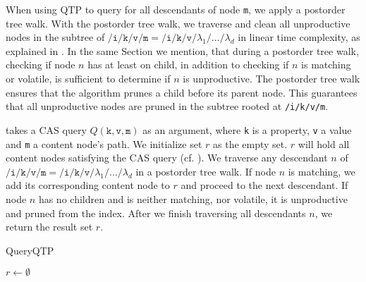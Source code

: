 \documentclass[abstracton,12pt]{scrartcl}
\theoremstyle{definition}
\begin{document}
When using QTP to query for all descendants of node \texttt{m}, we apply a postorder tree walk.
With the postorder tree walk, we traverse and clean all unproductive nodes in
the subtree of $\texttt{/i/k/v/m} =
\texttt{/i/k/v/} \lambda_1 \texttt{/} \dots \texttt{/} \lambda_d$ in linear time
complexity, as explained in . In the same Section we mention, that
during a postorder tree walk,
checking if node $n$ has at least on child, in addition to checking if $n$ is
matching or volatile, is sufficient to determine if $n$ is unproductive.
The postorder tree walk ensures that the algorithm prunes
a child before its parent node. This guarantees that all unproductive nodes are
pruned in the subtree rooted at \texttt{/i/k/v/m}.

 takes a CAS query
$Q(\texttt{k},\texttt{v},\texttt{m})$ as an argument, where
\texttt{k} is a property, \texttt{v} a value and \texttt{m} a content node's
path. We initialize set $r$
as the empty set. $r$ will hold all content nodes satisfying the CAS query (cf.
).
We traverse any descendant $n$ of $\texttt{/i/k/v/m} =
\texttt{/i/k/v/}\lambda_1\texttt{/}\dots\texttt{/}\lambda_d$ in a postorder tree
walk. If node $n$ is matching, we add its corresponding content node to
$r$ and proceed to the next descendant. If node $n$ has no children and is
neither matching, nor volatile, it is unproductive and pruned from the index.
After we finish traversing all descendants $n$, we return the result set $r$.

\begin{algorithm}
  \caption{QueryQTP}
  \DontPrintSemicolon
  $r \longleftarrow \emptyset$\;
  \;
  \label{algo:query_qtp_wapi}
\end{algorithm}
\end{document}
